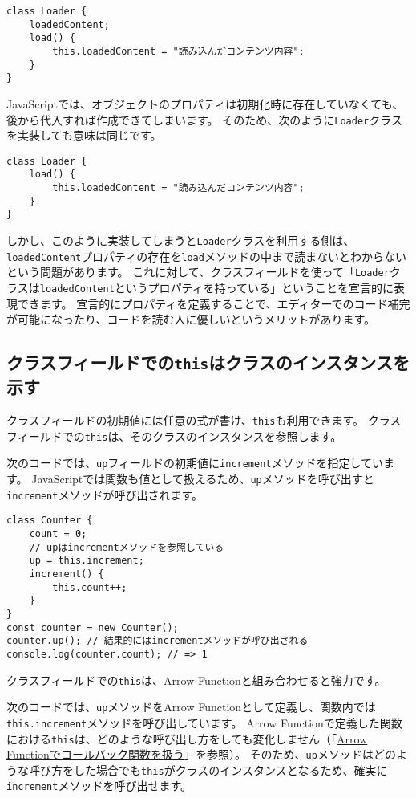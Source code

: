 \begin{lstlisting}
class Loader {
    loadedContent;
    load() {
        this.loadedContent = "読み込んだコンテンツ内容";
    }
}
\end{lstlisting}

JavaScriptでは、オブジェクトのプロパティは初期化時に存在していなくても、後から代入すれば作成できてしまいます。
そのため、次のように\texttt{Loader}クラスを実装しても意味は同じです。

\begin{lstlisting}
class Loader {
    load() {
        this.loadedContent = "読み込んだコンテンツ内容";
    }
}
\end{lstlisting}

しかし、このように実装してしまうと\texttt{Loader}クラスを利用する側は、\texttt{loadedContent}プロパティの存在を\texttt{load}メソッドの中まで読まないとわからないという問題があります。
これに対して、クラスフィールドを使って「\texttt{Loader}クラスは\texttt{loadedContent}というプロパティを持っている」ということを宣言的に表現できます。
宣言的にプロパティを定義することで、エディターでのコード補完が可能になったり、コードを読む人に優しいというメリットがあります。

\hypertarget{this-in-class-fields}{%
\subsection{クラスフィールドでの\texttt{this}はクラスのインスタンスを示す}\label{this-in-class-fields}}

クラスフィールドの初期値には任意の式が書け、\texttt{this}も利用できます。
クラスフィールドでの\texttt{this}は、そのクラスのインスタンスを参照します。

次のコードでは、\texttt{up}フィールドの初期値に\texttt{increment}メソッドを指定しています。
JavaScriptでは関数も値として扱えるため、\texttt{up}メソッドを呼び出すと\texttt{increment}メソッドが呼び出されます。

\begin{lstlisting}
class Counter {
    count = 0;
    // upはincrementメソッドを参照している
    up = this.increment;
    increment() {
        this.count++;
    }
}
const counter = new Counter();
counter.up(); // 結果的にはincrementメソッドが呼び出される
console.log(counter.count); // => 1
\end{lstlisting}

クラスフィールドでの\texttt{this}は、Arrow Functionと組み合わせると強力です。

次のコードでは、\texttt{up}メソッドをArrow Functionとして定義し、関数内では\texttt{this.increment}メソッドを呼び出しています。
Arrow Functionで定義した関数における\texttt{this}は、どのような呼び出し方をしても変化しません（「\hyperlink{arrow-function-callback}{Arrow Functionでコールバック関数を扱う}」を参照）。
そのため、\texttt{up}メソッドはどのような呼び方をした場合でも\texttt{this}がクラスのインスタンスとなるため、確実に\texttt{increment}メソッドを呼び出せます。

